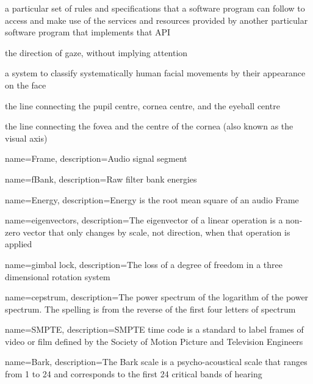 
{a particular set of rules and specifications that a software program can follow to access and make use of the services and resources provided by another particular software program that implements that API}

{the direction of gaze, without implying attention}

{a system to classify systematically human facial movements by their appearance on the face}

{the line connecting the pupil centre, cornea centre, and the eyeball centre}

{the line connecting the fovea and the centre of the cornea (also known as the visual axis)}




{
name=Frame,
description={Audio signal segment}
}


{
name=fBank,
description={Raw filter bank energies}
}


{
name=Energy,
description={Energy is the root mean square of an audio Frame}
}


{
name=eigenvectors,
description={The eigenvector of a linear operation is a non-zero vector that only changes by scale, not direction, when that operation is applied}
}

{
name=gimbal lock,
description={The loss of a degree of freedom in a three dimensional rotation system}
}

{
name=cepstrum,
description={The power spectrum of the logarithm of the power spectrum. The spelling is from the reverse of the first four letters of spectrum}
}

{
name=SMPTE,
description={SMPTE time code is a standard to label frames of video or film defined by the Society of Motion Picture and Television Engineers}
}


{
name=Bark,
description={The Bark scale is a psycho-acoustical scale that ranges from 1 to 24 and corresponds to the first 24 critical bands of hearing}
}


